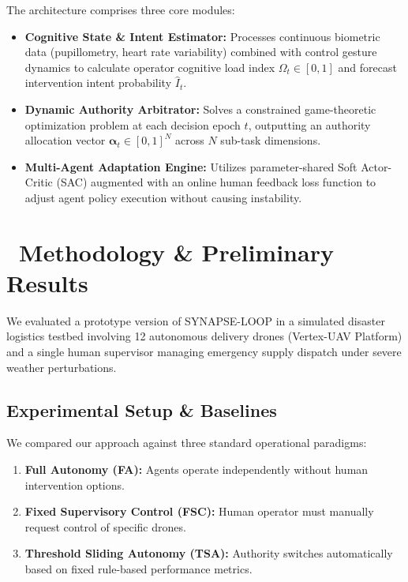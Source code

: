 \documentclass[11pt,a4paper]{scrartcl}
\begin{document}
The architecture comprises three core modules:
\begin{itemize}[leftmargin=1.5em, itemsep=3pt]
    \item \textbf{Cognitive State \& Intent Estimator:} Processes continuous biometric data (pupillometry, heart rate variability) combined with control gesture dynamics to calculate operator cognitive load index $\Omega_t \in [0, 1]$ and forecast intervention intent probability $\hat{I}_t$.
    \item \textbf{Dynamic Authority Arbitrator:} Solves a constrained game-theoretic optimization problem at each decision epoch $t$, outputting an authority allocation vector $\mathbf{\alpha}_t \in [0,1]^N$ across $N$ sub-task dimensions.
    \item \textbf{Multi-Agent Adaptation Engine:} Utilizes parameter-shared Soft Actor-Critic (SAC) augmented with an online human feedback loss function to adjust agent policy execution without causing instability.
\end{itemize}

\vspace{10pt}

\section{\texorpdfstring{\faChartBar\ }{ }Methodology \& Preliminary Results}

We evaluated a prototype version of SYNAPSE-LOOP in a simulated disaster logistics testbed involving 12 autonomous delivery drones (Vertex-UAV Platform) and a single human supervisor managing emergency supply dispatch under severe weather perturbations.

\subsection{Experimental Setup \& Baselines}
We compared our approach against three standard operational paradigms:
\begin{enumerate}[label=(\alph*), leftmargin=1.8em, itemsep=2pt]
    \item \textbf{Full Autonomy (FA):} Agents operate independently without human intervention options.
    \item \textbf{Fixed Supervisory Control (FSC):} Human operator must manually request control of specific drones.
    \item \textbf{Threshold Sliding Autonomy (TSA):} Authority switches automatically based on fixed rule-based performance metrics.
\end{enumerate}
\end{document}
